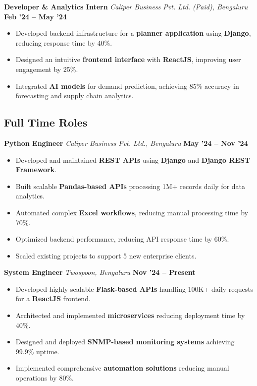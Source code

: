 \documentclass[a4paper,10pt]{article}
\begin{document}
\vspace{0.5em}

\textbf{Developer \& Analytics Intern} \hfill
\textit{Caliper Business Pvt. Ltd. (Paid), Bengaluru} \hfill \textbf{Feb '24 -- May '24}
\begin{itemize}
    \item Developed backend infrastructure for a \textbf{planner application} using \textbf{Django}, reducing response time by 40\%.
    \item Designed an intuitive \textbf{frontend interface} with \textbf{ReactJS}, improving user engagement by 25\%.
    \item Integrated \textbf{AI models} for demand prediction, achieving 85\% accuracy in forecasting and supply chain analytics.
\end{itemize}

\vspace{0.5em}

\subsection*{Full Time Roles}

\textbf{Python Engineer} \hfill
\textit{Caliper Business Pvt. Ltd., Bengaluru} \hfill \textbf{May '24 -- Nov '24}
\begin{itemize}
    \item Developed and maintained \textbf{REST APIs} using \textbf{Django} and \textbf{Django REST Framework}.
    \item Built scalable \textbf{Pandas-based APIs} processing 1M+ records daily for data analytics.
    \item Automated complex \textbf{Excel workflows}, reducing manual processing time by 70\%.
    \item Optimized backend performance, reducing API response time by 60\%.
    \item Scaled existing projects to support 5 new enterprise clients.
\end{itemize}

\textbf{System Engineer} \hfill
\textit{Twospoon, Bengaluru} \hfill \textbf{Nov '24 -- Present}
\begin{itemize}
    \item Developed highly scalable \textbf{Flask-based APIs} handling 100K+ daily requests for a \textbf{ReactJS} frontend.
    \item Architected and implemented \textbf{microservices} reducing deployment time by 40\%.
    \item Designed and deployed \textbf{SNMP-based monitoring systems} achieving 99.9\% uptime.
    \item Implemented comprehensive \textbf{automation solutions} reducing manual operations by 80\%.
\end{itemize}
\vspace{0.5em}
\end{document}
